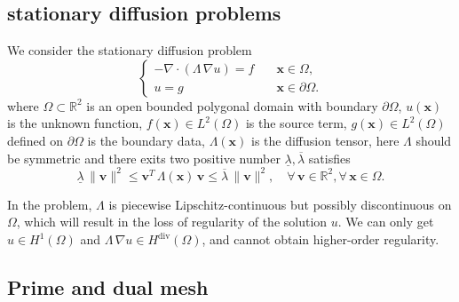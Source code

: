 \documentclass[times,review,preprint,authoryear]{elsarticle}
\newcommand{\bx}{\bm{x}}
\begin{document}
\subsection{stationary diffusion problems}\label{sec:prob}

We consider the stationary diffusion problem
\begin{equation}\label{eq:prob}
\left\{
\begin{aligned}
- \nabla \cdot (\Lambda \, \nabla u) = f & \quad \bx \in \Omega, \\
u = g & \quad \bx \in \partial \Omega.
\end{aligned}
\right.
\end{equation}
where $\Omega \subset \mathbb{R}^2$ is an open bounded polygonal domain with boundary $\partial \Omega$, $u(\bx)$ is the unknown function, $f(\bx) \in L^2(\Omega)$ is the source term, $g(\bx) \in L^2(\Omega)$ defined on $\partial \Omega$ is the boundary data, $\Lambda(\bx)$ is the diffusion tensor, here $\Lambda$ should be symmetric and there exits two positive number $\underline{\lambda}, \overline{\lambda}$ satisfies
\begin{equation*}
\underline{\lambda} \, \|\mathbf{v}\|^2 \leq \mathbf{v}^T \, \Lambda(\bx) \, \mathbf{v} \leq \overline{\lambda} \, \|\mathbf{v}\|^2, \quad \forall \, \mathbf{v} \in \mathbb{R}^2, \forall \, \bx \in \Omega.
\end{equation*}

In the problem, $\Lambda$ is piecewise Lipschitz-continuous but possibly discontinuous on $\Omega$, which will result in the loss of regularity of the solution $u$. We can only get $u \in H^1(\Omega)$ and $\Lambda \, \nabla u \in H^{\text{div}}(\Omega)$, and cannot obtain higher-order regularity.

\subsection{Prime and dual mesh}\label{sec:mesh}
\end{document}
